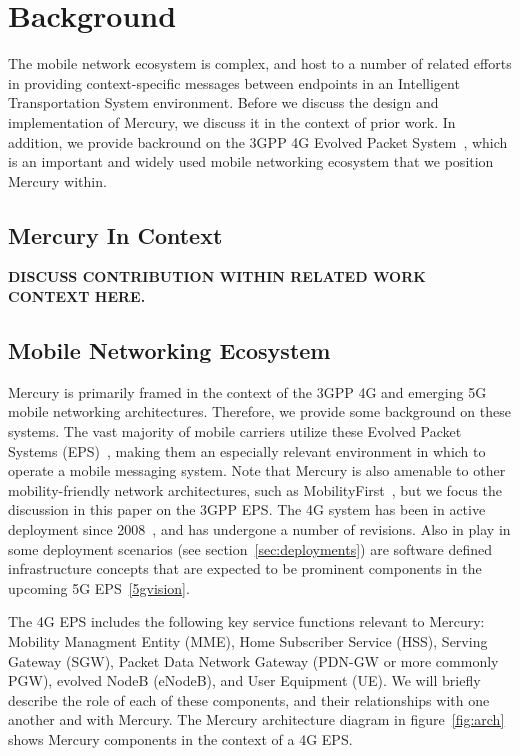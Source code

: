 \section{Background}

The mobile network ecosystem is complex, and host to a number of
related efforts in providing context-specific messages between
endpoints in an Intelligent Transportation System environment. Before
we discuss the design and implementation of Mercury, we discuss it in
the context of prior work. In addition, we provide backround on the
3GPP 4G Evolved Packet System~\cite{4G}, which is an important and
widely used mobile networking ecosystem that we position Mercury
within.

\subsection{Mercury In Context}

\textbf{DISCUSS CONTRIBUTION WITHIN RELATED WORK CONTEXT HERE.}

\subsection{Mobile Networking Ecosystem}

Mercury is primarily framed in the context of the 3GPP 4G and emerging
5G mobile networking architectures. Therefore, we provide some
background on these systems.  The vast majority of mobile carriers
utilize these Evolved Packet Systems (EPS)~\cite{mobile-stats}, making
them an especially relevant environment in which to operate a mobile
messaging system.  Note that Mercury is also amenable to other
mobility-friendly network architectures, such as
MobilityFirst~\cite{mobility-first}, but we focus the discussion in
this paper on the 3GPP EPS.  The 4G system has been in active
deployment since 2008~\cite{chen2015financial}, and has undergone a
number of revisions. Also in play in some deployment scenarios (see
section~\ref{sec:deployments}) are software defined infrastructure
concepts that are expected to be prominent components in the upcoming
5G EPS~\ref{5gvision}.

The 4G EPS includes the following key service functions relevant to
Mercury: Mobility Managment Entity (MME), Home Subscriber Service
(HSS), Serving Gateway (SGW), Packet Data Network Gateway (PDN-GW or
more commonly PGW), evolved NodeB (eNodeB), and User Equipment (UE).
We will briefly describe the role of each of these components, and
their relationships with one another and with Mercury. The Mercury
architecture diagram in figure~\ref{fig:arch} shows Mercury
components in the context of a 4G EPS.

